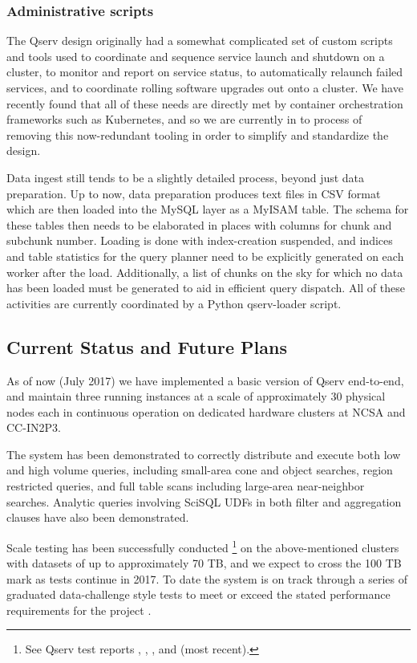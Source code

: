 \documentclass[DM,lsstdraft,toc]{lsstdoc}
\begin{document}
\subsubsection{Administrative scripts}\label{administrative-scripts}

The Qserv design originally had a somewhat complicated set of custom scripts
and tools used to coordinate and sequence service launch and shutdown on a
cluster, to monitor and report on service status, to automatically relaunch
failed services, and to coordinate rolling software upgrades out onto a
cluster.  We have recently found that all of these needs are directly met by
container orchestration frameworks such as Kubernetes, and so we are currently
in to process of removing this now-redundant tooling in order to simplify and
standardize the design.

Data ingest still tends to be a slightly detailed process, beyond just data
preparation. Up to now, data preparation produces text files in CSV format
which are then loaded into the MySQL layer as a MyISAM table. The schema for
these tables then needs to be elaborated in places with columns for chunk and
subchunk number.  Loading is done with index-creation suspended, and indices
and table statistics for the query planner need to be explicitly generated
on each worker after the load.  Additionally, a list of chunks on the sky
for which no data has been loaded must be generated to aid in efficient
query dispatch.  All of these activities are currently coordinated by a
Python qserv-loader script.

\subsection{Current Status and Future
Plans}\label{current-status-and-future-plans}

As of now (July 2017) we have implemented a basic version of Qserv end-to-end,
and maintain three running instances at a scale of approximately 30 physical
nodes each in continuous operation on dedicated hardware clusters at NCSA and
CC-IN2P3.

The system has been demonstrated to correctly distribute and execute both low
and high volume queries, including small-area cone and object searches, region
restricted queries, and full table scans including large-area near-neighbor
searches.  Analytic queries involving SciSQL UDFs in both filter and
aggregation clauses have also been demonstrated.

Scale testing has been successfully conducted \footnote{See Qserv test reports
, , , and 
(most recent).} on the above-mentioned clusters with datasets of up to
approximately 70 TB, and we expect to cross the 100 TB mark as tests continue
in 2017.  To date the system is on track through a series of graduated data-challenge
style tests  to meet or exceed the stated
performance requirements for the project .
\end{document}
